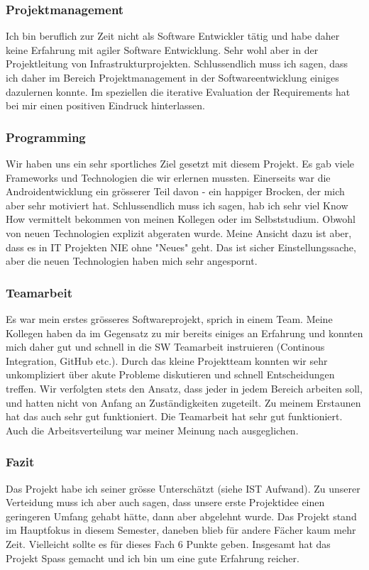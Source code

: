 \documentclass[10pt,a4paper]{scrartcl}
\begin{document}
\subsubsection*{Projektmanagement}
Ich bin beruflich zur Zeit nicht als Software Entwickler tätig und habe daher keine Erfahrung mit agiler Software Entwicklung. Sehr wohl aber in der Projektleitung von Infrastrukturprojekten. Schlussendlich muss ich sagen, dass ich daher im Bereich Projektmanagement in der Softwareentwicklung einiges dazulernen konnte. Im speziellen die iterative Evaluation der Requirements hat bei mir einen positiven Eindruck hinterlassen.

\subsubsection*{Programming}
Wir haben uns ein sehr sportliches Ziel gesetzt mit diesem Projekt. Es gab viele Frameworks und Technologien die wir erlernen mussten. Einerseits war die Androidentwicklung ein grösserer Teil davon - ein happiger Brocken, der mich aber sehr motiviert hat.
Schlussendlich muss ich sagen, hab ich sehr viel Know How vermittelt bekommen von meinen Kollegen oder im Selbststudium. Obwohl von neuen Technologien explizit abgeraten wurde.
Meine Ansicht dazu ist aber, dass es in IT Projekten NIE ohne "Neues" geht. Das ist sicher Einstellungssache, aber die neuen Technologien haben mich sehr angespornt. 

\subsubsection*{Teamarbeit}
Es war mein erstes grösseres Softwareprojekt, sprich in einem Team. Meine Kollegen haben da im Gegensatz zu mir bereits einiges an Erfahrung und konnten mich daher gut und schnell in die SW Teamarbeit instruieren (Continous Integration, GitHub etc.). Durch das kleine Projektteam konnten wir sehr unkompliziert über akute Probleme diskutieren und schnell Entscheidungen treffen. Wir verfolgten stets den Ansatz, dass jeder in jedem Bereich arbeiten soll, und hatten nicht von Anfang an Zuständigkeiten zugeteilt. Zu meinem Erstaunen hat das auch sehr gut funktioniert. Die Teamarbeit hat sehr gut funktioniert. Auch die Arbeitsverteilung war meiner Meinung nach ausgeglichen. 

\subsubsection*{Fazit}
Das Projekt habe ich seiner grösse Unterschätzt (siehe IST Aufwand). Zu unserer Verteidung muss ich aber auch sagen, dass unsere erste Projektidee einen geringeren Umfang gehabt hätte, dann aber abgelehnt wurde. Das Projekt stand im Hauptfokus in diesem Semester, daneben blieb für andere Fächer kaum mehr Zeit. Vielleicht sollte es für dieses Fach 6 Punkte geben. Insgesamt hat das Projekt Spass gemacht und ich bin um eine gute Erfahrung reicher.
\end{document}
